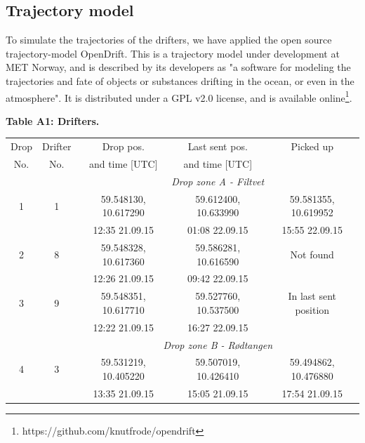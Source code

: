 \documentclass[12pt,a4paper,english]{article}
\begin{document}
\subsection{Trajectory model}
\label{sect:trajmod}
To simulate the trajectories of the drifters, we have applied the open source trajectory-model OpenDrift. This is a trajectory model under development at MET Norway, and is described by its developers as "a software for modeling the trajectories and fate of objects or substances drifting in the ocean, or even in the atmosphere". It is distributed under a GPL v2.0 license, and is available online\footnote{https://github.com/knutfrode/opendrift}.

\begin{table}[tb]
{\bf Table A1: Drifters.}\\
\label{tab:Drifters}
\begin{tabular}{|c|cccc|} 
        \hline
        Drop & Drifter & Drop pos.            & Last sent pos.          & Picked up                  \\
        No.  & No.     & and time [UTC]       & and time [UTC]          &                            \\ \hline
             &         &          \multicolumn{3}{c}{\textit{Drop zone A - Filtvet}}                 \\ 
        1    & 1       & 59.548130, 10.617290 & 59.612400, 10.633990    & 59.581355, 10.619952       \\
             &         & 12:35 21.09.15       & 01:08 22.09.15          & 15:55 22.09.15             \\ 
        2    & 8       & 59.548328, 10.617360 & 59.586281, 10.616590    & Not found                  \\
             &         & 12:26 21.09.15       & 09:42 22.09.15          &                            \\
        3    & 9       & 59.548351, 10.617710 & 59.527760, 10.537500    & In last sent position      \\
             &         & 12:22 21.09.15       & 16:27 22.09.15          &                            \\ \hline 
             &         &          \multicolumn{3}{c}{\textit{Drop zone B - R\o dtangen}}             \\
        4    & 3       & 59.531219, 10.405220 & 59.507019, 10.426410    & 59.494862, 10.476880       \\
             &         & 13:35 21.09.15       & 15:05 21.09.15          & 17:54 21.09.15             \\

\end{tabular}
\end{table}
\end{document}
